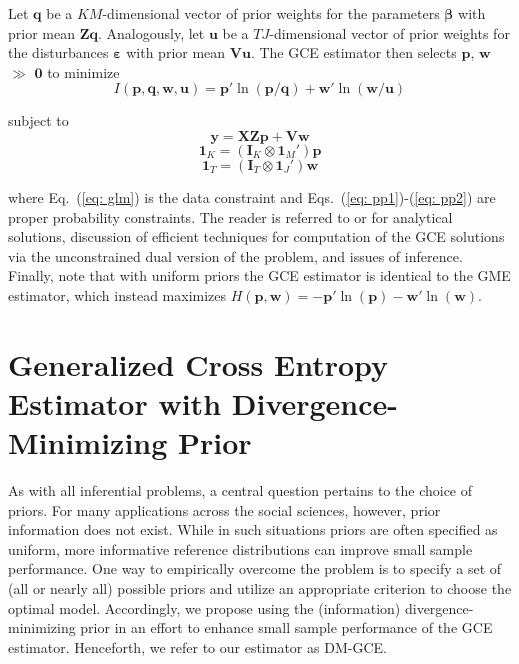 \documentclass{elsarticle}
\begin{document}
Let $\mathbf{q}$ be a $KM$-dimensional vector of prior weights for the 
parameters $\mathbf{\beta}$ with prior mean $\mathbf{Zq}$.
Analogously, let $\mathbf{u}$ be a $TJ$-dimensional vector of prior weights 
for the disturbances $\mathbf{\varepsilon}$ with prior mean $\mathbf{Vu}$.
The GCE estimator then selects $\mathbf{p}$, $\mathbf{w}$ $\gg$ 
$\mathbf{0}$ to minimize 
\begin{equation}
I({\mathbf{p}, \mathbf{q}, \mathbf{w}, \mathbf{u}}) = 
\mathbf{p}' \ln (\mathbf{p}/\mathbf{q}) + 
\mathbf{w}' \ln (\mathbf{w}/\mathbf{u})
\label{eq: ce}
\end{equation}

\noindent
subject to
\begin{equation}
\mathbf{y} = \mathbf{X Z p} 
+ \mathbf{V w}
\label{eq: glm}
\end{equation}
\begin{equation}
\mathbf{1}_K = (\mathbf{I}_K \otimes \mathbf{1}_M')\mathbf{p}
\label{eq: pp1}
\end{equation}
\begin{equation}
\mathbf{1}_T = (\mathbf{I}_T \otimes \mathbf{1}_J')\mathbf{w}
\label{eq: pp2}
\end{equation}

\noindent
where Eq.\ (\ref{eq: glm}) is the data constraint and Eqs.\ 
(\ref{eq: pp1})-(\ref{eq: pp2}) are proper probability constraints.
The reader is referred to \citet[Chap.\ 6]{golan1996} or 
\citet[Chap.\ 6]{golan2008} for analytical solutions, discussion of 
efficient techniques for computation of the GCE solutions via the 
unconstrained dual version of the problem, and issues of inference.
Finally, note that with uniform priors the GCE estimator is identical to 
the GME estimator, which instead maximizes $H(\mathbf{p},\mathbf{w}) 
= - \mathbf{p}' \ln (\mathbf{p}) - \mathbf{w}' \ln (\mathbf{w})$.


\section{Generalized Cross Entropy Estimator with Divergence-Minimizing 
Prior}
\label{sec: dm-gce}

As with all inferential problems, a central question pertains to the choice of 
priors. 
For many applications across the social sciences, however, prior information 
does not exist. 
While in such situations priors are often specified as uniform, more 
informative reference distributions can improve small sample performance.
One way to empirically overcome the problem is to specify a set of (all or 
nearly all) possible priors and utilize an appropriate criterion to choose the 
optimal model.
Accordingly, we propose using the (information) divergence-minimizing 
prior in an effort to enhance small sample performance of the GCE 
estimator. 
Henceforth, we refer to our estimator as DM-GCE. 
\end{document}
